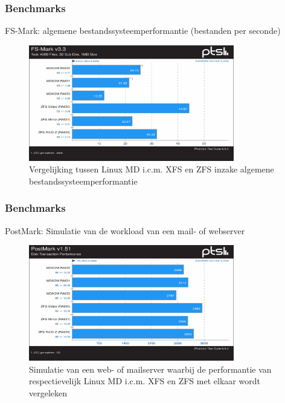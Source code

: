 \documentclass{beamer}
\begin{document}
\begin{frame}
  \frametitle{Benchmarks}
  FS-Mark: algemene bestandssysteemperformantie (bestanden per seconde)    
  \begin{figure}
    \centering
    \includegraphics[width=0.8\textwidth]{img/Testen/FS-Mark/fmark.png}
    \caption{Vergelijking tussen Linux MD i.c.m. XFS en ZFS inzake algemene bestandssysteemperformantie}
  \end{figure}
\end{frame}



\begin{frame}
  \frametitle{Benchmarks}
  PostMark: Simulatie van de workload van een mail- of webserver    
  \begin{figure}
    \centering
    \includegraphics[width=0.8\textwidth]{img/Testen/PostMark/postmark.png}
    \caption{Simulatie van een web- of mailserver waarbij de performantie van respectievelijk Linux MD i.c.m. XFS en ZFS met elkaar wordt vergeleken}
  \end{figure}
\end{frame}


\end{document}
